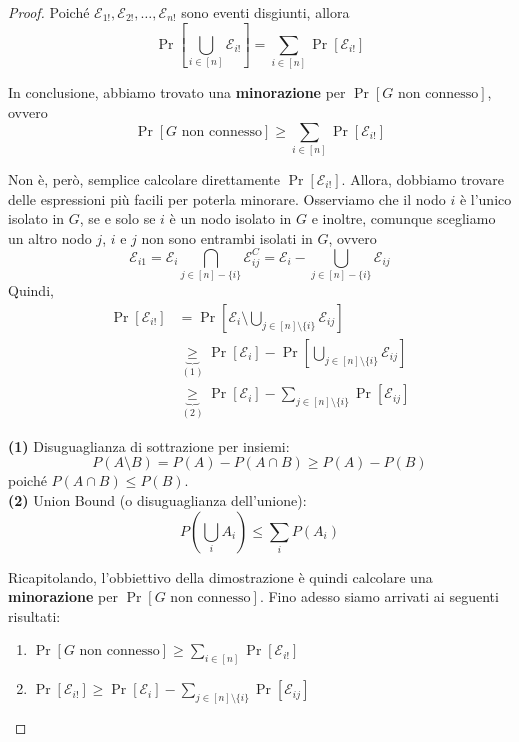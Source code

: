 \begin{proof}
Poiché $\mathcal{E}_{1!}, \mathcal{E}_{2!}, \dots, \mathcal{E}_{n!}$ sono eventi disgiunti, allora
\[
\Pr\left[\bigcup_{i \in [n]} \mathcal{E}_{i!}\right] = \sum_{i \in [n]}\Pr[\mathcal{E}_{i!}]
\]

In conclusione, abbiamo trovato una \textbf{minorazione} per $\Pr[G \text{ non connesso}]$, ovvero
\[
\Pr[G \text{ non connesso}] \geq \sum_{i \in [n]}\Pr[\mathcal{E}_{i!}]
\]

 Non è, però, semplice calcolare direttamente $\Pr[\mathcal{E}_{i!}]$. Allora, dobbiamo trovare delle espressioni più facili per poterla minorare. Osserviamo che il nodo $i$ è l'unico isolato in $G$, se e solo se $i$ è un nodo isolato in $G$ e inoltre, comunque scegliamo un altro nodo $j$, $i$ e $j$ non sono entrambi isolati in $G$, ovvero
\[
\mathcal{E}_{i1} = \mathcal{E}_i \bigcap_{j \in [n] - \{i\}} \mathcal{E}_{ij}^C = \mathcal{E}_i - \bigcup_{j \in [n] - \{i\}}\mathcal{E}_{ij}
\]
Quindi,
\begin{align*}
    \Pr[\mathcal{E}_{i!}] 
    &= \Pr\!\left[\mathcal{E}_i \setminus 
        \bigcup_{j \in [n] \setminus \{i\}}\mathcal{E}_{ij}\right] \\[4pt]
    &\underbrace{\geq}_{(1)} 
        \Pr[\mathcal{E}_i] 
        - \Pr\!\left[\bigcup_{j \in [n] \setminus \{i\}}\mathcal{E}_{ij}\right] \\[6pt]
    &\underbrace{\geq}_{(2)} 
        \Pr[\mathcal{E}_i] 
        - \sum_{j \in [n] \setminus \{i\}}\Pr[\mathcal{E}_{ij}]
\end{align*}

\smallskip

\textbf{(1)} Disuguaglianza di sottrazione per insiemi: 
\[
P(A\setminus B) = P(A) - P(A\cap B) \ge P(A) - P(B)
\]
poiché \(P(A\cap B) \le P(B)\). \\[4pt]
\textbf{(2)} Union Bound (o disuguaglianza dell'unione): 
\[
P\!\left(\bigcup_i A_i\right) \le \sum_i P(A_i)
\]

 Ricapitolando, l'obbiettivo della dimostrazione è quindi calcolare una \textbf{minorazione} per $\Pr[G \text{ non connesso}]$. Fino adesso siamo arrivati ai seguenti risultati:
\begin{enumerate}
    \item $\Pr[G \text{ non connesso}] \geq \sum\limits_{i \in [n]}\Pr[\mathcal{E}_{i!}]$
    \item $\Pr[\mathcal{E}_{i!}] \geq \Pr[\mathcal{E}_i] - \sum\limits_{j \in [n] \setminus \{i\}} \Pr[\mathcal{E}_{ij}]$
\end{enumerate}


\end{proof}
